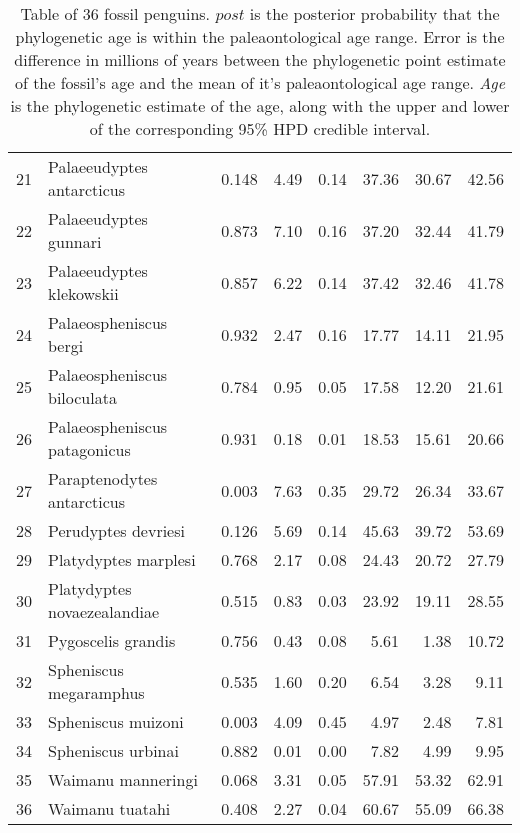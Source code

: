 \documentclass[11pt]{article}
\begin{document}
\begin{table}[ht]
\begin{tabular}{rlrrrrrr}
  21 & Palaeeudyptes antarcticus & 0.148 & 4.49 & 0.14 & 37.36 & 30.67 & 42.56 \\ 
  22 & Palaeeudyptes gunnari & 0.873 & 7.10 & 0.16 & 37.20 & 32.44 & 41.79 \\ 
  23 & Palaeeudyptes klekowskii & 0.857 & 6.22 & 0.14 & 37.42 & 32.46 & 41.78 \\ 
  24 & Palaeospheniscus bergi & 0.932 & 2.47 & 0.16 & 17.77 & 14.11 & 21.95 \\ 
  25 & Palaeospheniscus biloculata & 0.784 & 0.95 & 0.05 & 17.58 & 12.20 & 21.61 \\ 
  26 & Palaeospheniscus patagonicus & 0.931 & 0.18 & 0.01 & 18.53 & 15.61 & 20.66 \\ 
  27 & Paraptenodytes antarcticus & 0.003 & 7.63 & 0.35 & 29.72 & 26.34 & 33.67 \\ 
  28 & Perudyptes devriesi & 0.126 & 5.69 & 0.14 & 45.63 & 39.72 & 53.69 \\ 
  29 & Platydyptes marplesi & 0.768 & 2.17 & 0.08 & 24.43 & 20.72 & 27.79 \\ 
  30 & Platydyptes novaezealandiae & 0.515 & 0.83 & 0.03 & 23.92 & 19.11 & 28.55 \\ 
  31 & Pygoscelis grandis & 0.756 & 0.43 & 0.08 & 5.61 & 1.38 & 10.72 \\ 
  32 & Spheniscus megaramphus & 0.535 & 1.60 & 0.20 & 6.54 & 3.28 & 9.11 \\ 
  33 & Spheniscus muizoni & 0.003 & 4.09 & 0.45 & 4.97 & 2.48 & 7.81 \\ 
  34 & Spheniscus urbinai & 0.882 & 0.01 & 0.00 & 7.82 & 4.99 & 9.95 \\ 
  35 & Waimanu manneringi & 0.068 & 3.31 & 0.05 & 57.91 & 53.32 & 62.91 \\ 
  36 & Waimanu tuatahi & 0.408 & 2.27 & 0.04 & 60.67 & 55.09 & 66.38 \\ 
   \hline
\end{tabular}
\caption{\label{fossilTable}Table of 36 fossil penguins. $post$ is the posterior probability that the phylogenetic age is within the paleaontological age range. Error is the difference in millions of years between the phylogenetic point estimate of the fossil's age and the mean of it's paleaontological age range. {\em Age} is the phylogenetic estimate of the age, along with the upper and lower of the corresponding 95\% HPD credible interval.}
\end{table}

\printbibliography
\end{document}
